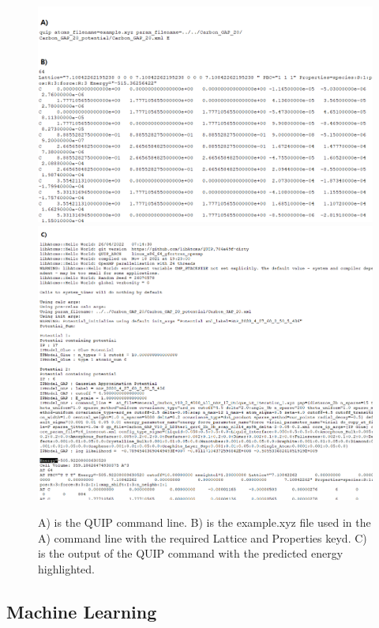 \documentclass[12pt, abstract = true]{scrartcl}
\begin{document}
\begin{figure}
  \centering
  \includegraphics[scale=.4]{quip.png}
  \includegraphics[scale=.35]{quip4.png}
  
  \caption{A) is the QUIP command line. B) is the example.xyz file used in the A) command line with the required Lattice and Properties keyd. C) is the output of the QUIP command with the predicted energy highlighted. }\label{fig:quip}
\end{figure}


\newpage


\subsection{Machine Learning}
\end{document}
